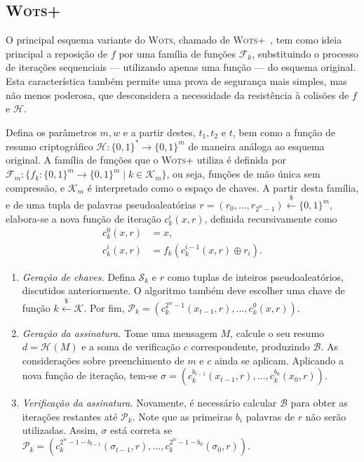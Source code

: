 \documentclass[12pt,notitlepage]{report}
\newcommand{\hh}{\mathcal{H}}
\newcommand{\pk}{\mathcal{P}_k}
\newcommand{\sk}{\mathcal{S}_k}
\newcommand{\hash}[2][]{\mathcal{H}^{#1}(#2)}
\newcommand{\binwds}[1]{\{0, 1\}^{#1}}
\newcommand{\fhash}[1]{\hh{} : \binwds{*} \longrightarrow \binwds{#1}}
\begin{document}
\subsection{\textsc{Wots+}}

O principal esquema variante do \textsc{Wots}, chamado de
\textsc{Wots+}~\cite{Hlsing2013}, tem como ideia principal a
reposição de $f$ por uma família de funções $\mathcal{F}_k$, substituindo o
processo de iterações sequenciais --- utilizando apenas uma função --- do
esquema original. Esta característica também permite uma prova de segurança
mais simples, mas não menos poderosa, que desconsidera a necessidade da
resistência à colisões de $f$ e $\hh{}$.

Defina os parâmetros $m, w$ e a partir destes, $t_1, t_2 \text{ e } t$, bem
como a função de resumo criptográfico $\fhash{m}$ de maneira análoga ao esquema
original. A família de funções que o \textsc{Wots+} utiliza é definida por
$\mathcal{F}_m : \{f_k : \binwds{m} \longrightarrow \binwds{m} \mid k \in
\mathcal{K}_m\}$, ou seja, funções de mão única sem compressão, e
$\mathcal{K}_m$ é interpretado como o espaço de chaves. A partir desta família,
e de uma tupla de palavras pseudoaleatórias $r = (r_0, \dots, r_{2^w - 1})
\stackrel{\$}{\longleftarrow} \binwds{m}$, elabora-se a nova função de iteração
$c^{i}_{k}(x, r)$, definida recursivamente como
\begin{equation}
  \begin{split}
    c^{0}_{k}(x, r) &= x, \\
    c^{i}_{k}(x, r) &= f_k(c^{i-1}_{k}(x, r) \oplus r_i).
  \end{split}
\end{equation}

\begin{enumerate}

  \item[] \emph{Geração de chaves.} Defina $\sk{}$ e $r$ como tuplas de
      inteiros pseudoaleatórios, discutidos anteriormente. O algoritmo também
        deve escolher uma chave de função $k \stackrel{\$}\longleftarrow
        \mathcal{K}$. Por fim, $\pk{} = (c^{2^w-1}_{k}(x_{t-1}, r), \dots,
        c^{0}_{k}(x, r))$.

  \item[] \emph{Geração da assinatura.} Tome uma mensagem $M$, calcule o seu
      resumo $d = \hash{M}$ e a soma de verificação $c$ correspondente,
        produzindo $\mathcal{B}$. As considerações sobre preenchimento de $m$ e
        $c$ ainda se aplicam. Aplicando a nova função de iteração, tem-se
        $\sigma = (c^{b_{t - 1}}_{k}(x_{t-1}, r), \dots, c^{b_{0}}_{k}(x_{0},
        r))$.

  \item[] \emph{Verificação da assinatura.} Novamente, é necessário calcular
      $\mathcal{B}$ para obter as iterações restantes até $\pk{}$. Note que as
        primeiras $b_i$ palavras de $r$ não serão utilizadas. Assim, $\sigma$
        está correta se $\pk{} = (c^{2^{w} - 1 - b_{t - 1}}_{k}(\sigma_{t-1},
        r), \dots, c^{2^{w} - 1 - b_{0}}_{k}(\sigma_{0}, r))$.

\end{enumerate}
\end{document}
